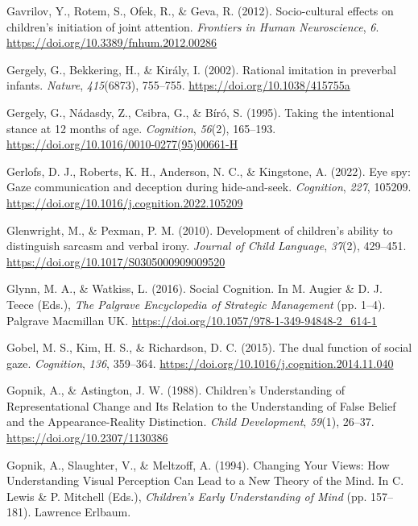 \documentclass[
]{scrbook}
\newlength{\cslhangindent}
\newenvironment{CSLReferences}[2] %
 {\begin{list}{}{%
  \setlength{\itemindent}{0pt}
  \setlength{\leftmargin}{0pt}
  \setlength{\parsep}{0pt}
  \ifodd #1
   \setlength{\leftmargin}{\cslhangindent}
   \setlength{\itemindent}{-1\cslhangindent}
  \fi
  \setlength{\itemsep}{#2\baselineskip}}}
 {\end{list}}
\begin{document}
\begin{CSLReferences}{1}{0}
Gavrilov, Y., Rotem, S., Ofek, R., \& Geva, R. (2012). Socio-cultural effects on children's initiation of joint attention. \emph{Frontiers in Human Neuroscience}, \emph{6}. \url{https://doi.org/10.3389/fnhum.2012.00286}

Gergely, G., Bekkering, H., \& Király, I. (2002). Rational imitation in preverbal infants. \emph{Nature}, \emph{415}(6873), 755--755. \url{https://doi.org/10.1038/415755a}

Gergely, G., Nádasdy, Z., Csibra, G., \& Bíró, S. (1995). Taking the intentional stance at 12 months of age. \emph{Cognition}, \emph{56}(2), 165--193. \url{https://doi.org/10.1016/0010-0277(95)00661-H}

Gerlofs, D. J., Roberts, K. H., Anderson, N. C., \& Kingstone, A. (2022). Eye spy: {Gaze} communication and deception during hide-and-seek. \emph{Cognition}, \emph{227}, 105209. \url{https://doi.org/10.1016/j.cognition.2022.105209}

Glenwright, M., \& Pexman, P. M. (2010). Development of children's ability to distinguish sarcasm and verbal irony. \emph{Journal of Child Language}, \emph{37}(2), 429--451. \url{https://doi.org/10.1017/S0305000909009520}

Glynn, M. A., \& Watkiss, L. (2016). Social {Cognition}. In M. Augier \& D. J. Teece (Eds.), \emph{The {Palgrave Encyclopedia} of {Strategic Management}} (pp. 1--4). Palgrave Macmillan UK. \url{https://doi.org/10.1057/978-1-349-94848-2_614-1}

Gobel, M. S., Kim, H. S., \& Richardson, D. C. (2015). The dual function of social gaze. \emph{Cognition}, \emph{136}, 359--364. \url{https://doi.org/10.1016/j.cognition.2014.11.040}

Gopnik, A., \& Astington, J. W. (1988). Children's {Understanding} of {Representational Change} and {Its Relation} to the {Understanding} of {False Belief} and the {Appearance-Reality Distinction}. \emph{Child Development}, \emph{59}(1), 26--37. \url{https://doi.org/10.2307/1130386}

Gopnik, A., Slaughter, V., \& Meltzoff, A. (1994). Changing {Your Views}: {How Understanding Visual Perception Can Lead} to a {New Theory} of the {Mind}. In C. Lewis \& P. Mitchell (Eds.), \emph{Children's {Early Understanding} of {Mind}} (pp. 157--181). Lawrence Erlbaum.


\end{CSLReferences}
\end{document}
